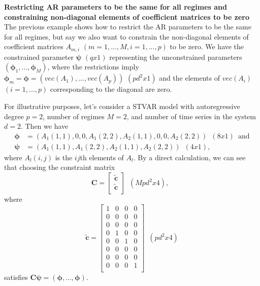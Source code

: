 \documentclass[nojss]{jss}
\begin{document}
\textbf{Restricting AR parameters to be the same for all regimes and constraining non-diagonal elements of coefficient matrices to be zero}\\
The previous example shows how to restrict the AR parameters to be the same for all regimes, but say we also want to constrain the non-diagonal elements of coefficient matrices $A_{m,i}$ $(m=1,...,M, i=1,...,p)$ to be zero. We have the constrained parameter $\boldsymbol{\psi}$ $(qx1)$ representing the unconstrained parameters $(\boldsymbol{\phi}_1,...,\boldsymbol{\phi}_M)$, where the restrictions imply $\boldsymbol{\phi}_m=\boldsymbol{\phi}=(vec(A_1),...,vec(A_p))$ $(pd^2x1)$ and the elements of $vec(A_i)$ $(i=1,...,p)$ corresponding to the diagonal are zero.

For illustrative purposes, let's consider a STVAR model with autoregressive degree $p=2$, number of regimes $M=2$, and number of time series in the system $d=2$. Then we have
\begin{align}
\boldsymbol{\phi}&=(A_1(1,1),0,0,A_1(2,2),A_2(1,1),0,0,A_2(2,2)) \enspace (8x1) \enspace \text{and}\\
\boldsymbol{\psi}&=(A_1(1,1),A_1(2,2),A_2(1,1),A_2(2,2)) \enspace (4x1),
\end{align}
where $A_l(i,j)$ is the $ij$th elements of $A_l$. By a direct calculation, we can see that choosing the constraint matrix
\begin{equation}
\boldsymbol{C}=\left[{\begin{array}{c}
   \boldsymbol{\tilde{c}} \\
   \boldsymbol{\tilde{c}} \\
  \end{array}}\right]
\enspace (Mpd^2x4),
\enspace
\end{equation}
where
\begin{equation}
\boldsymbol{\tilde{c}}=\left[{\begin{array}{cccc}
   1 & 0 & 0 & 0 \\
   0 & 0 & 0 & 0 \\
   0 & 0 & 0 & 0 \\
   0 & 1 & 0 & 0 \\
   0 & 0 & 1 & 0 \\
   0 & 0 & 0 & 0 \\
   0 & 0 & 0 & 0 \\
   0 & 0 & 0 & 1 \\
  \end{array}}\right]
\enspace (pd^2x4)
\end{equation}
satisfies $\boldsymbol{C}\boldsymbol{\psi}=(\boldsymbol{\phi},...,\boldsymbol{\phi}).$
\end{document}
